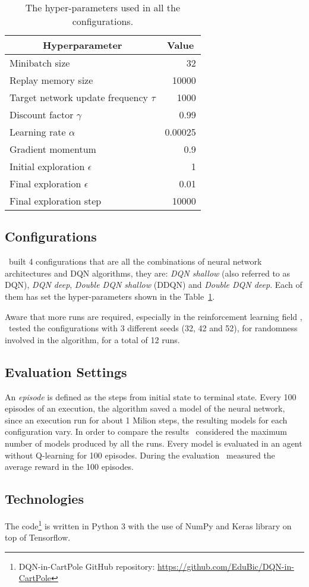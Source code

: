 \begin{table}
	\centering
	\begin{tabular}{|l|r|}
		\hline
		\multicolumn{1}{|c|}{\textbf{Hyperparameter}} &
		\multicolumn{1}{|c|}{\textbf{Value}}        \\
		\hline
		Minibatch size & 32 \\
		Replay memory size & 10000 \\
		Target network update frequency $\tau$ & 1000 \\
		Discount factor $\gamma$ & 0.99 \\
		Learning rate $\alpha$ & 0.00025 \\
		Gradient momentum & 0.9 \\
		Initial exploration $\epsilon$ & 1 \\
		Final exploration $\epsilon$ & 0.01 \\
		Final exploration step & 10000 \\
		\hline
	\end{tabular}
	
	\caption{The hyper-parameters used in all the configurations.}
	\label{tab:my-hyperparams}
\end{table}

\subsection{Configurations}

\Auth~built 4 configurations that are all the combinations of neural network architectures and DQN algorithms, they are: \textit{DQN shallow} (also referred to as DQN), \textit{DQN deep}, \textit{Double DQN shallow} (DDQN) and \textit{Double DQN deep}. Each of them has set the hyper-parameters shown in the Table~\ref{tab:my-hyperparams}.

Aware that more runs are required, especially in the reinforcement learning field \cite{DBLP:journals/corr/abs-1709-06560}, \auth~tested the configurations with 3 different seeds (32, 42 and 52), for randomness involved in the algorithm, for a total of 12 runs.


\subsection{Evaluation Settings}

An \textit{episode} is defined as the steps from initial state to terminal state. Every 100 episodes of an execution, the algorithm saved a model of the neural network, since an execution run for about 1 Milion steps, the resulting models for each configuration vary. In order to compare the results \auth~considered the maximum number of models produced by all the runs. Every model is evaluated in an agent without Q-learning for 100 episodes. During the evaluation \auth~measured the average reward in the 100 episodes.

\subsection{Technologies}
The code\footnote{DQN-in-CartPole GitHub repository: \url{https://github.com/EduBic/DQN-in-CartPole}} is written in Python 3 with the use of NumPy and Keras library on top of Tensorflow.





